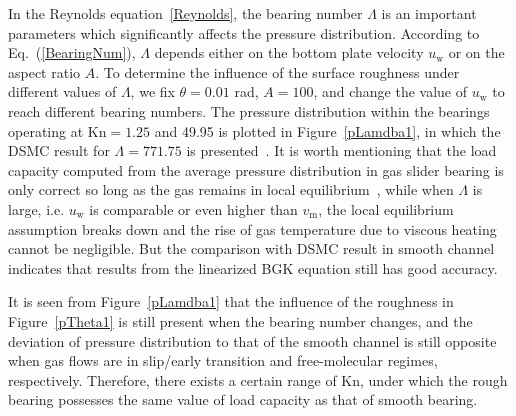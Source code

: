 
In the Reynolds equation~\eqref{Reynolds}, the bearing number $\Lambda$ is an important parameters which significantly affects the pressure distribution. According to Eq.~(\ref{BearingNum}), $\Lambda$ depends either on the bottom plate velocity $u_\text{w}$ or on the aspect ratio $A$. To determine the influence of the surface roughness under different values of $\Lambda$, we fix $\theta=0.01$ rad, $A=100$, and change the value of $u_\text{w}$ to reach different bearing numbers. The pressure distribution within the bearings operating at $\text{Kn}=1.25$ and 49.95 is plotted in Figure~\ref{pLamdba1}, in which the DSMC result for $\Lambda=771.75$ is presented~\cite{Alexander1994}. It is worth mentioning that the load capacity computed from the average pressure distribution in gas slider bearing is only correct so long as the gas remains in local equilibrium~\cite{Alexander1994}, while when $\Lambda$ is large, i.e. $u_\text{w}$ is comparable or even higher than $v_\text{m}$, the local equilibrium assumption breaks down and the rise of gas temperature due to viscous heating cannot be negligible. But the comparison with DSMC result in smooth channel indicates that results from the linearized BGK equation still has good accuracy.



It is seen from Figure~\ref{pLamdba1} that the influence of the roughness in Figure~\ref{pTheta1} is still present when the bearing number changes, and the deviation of pressure distribution to that of the smooth channel is still opposite when gas flows are in slip/early transition and free-molecular regimes, respectively. Therefore, there exists a certain range of $\text{Kn}$, under which the rough bearing possesses the same value of load capacity as that of smooth bearing. %





